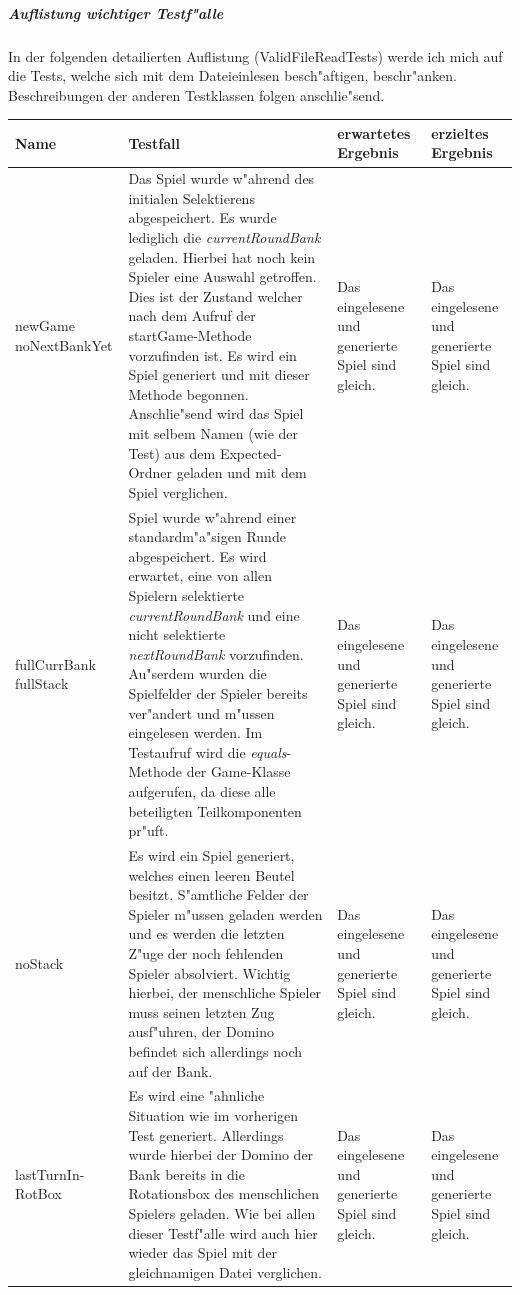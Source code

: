\subparagraph{Auflistung wichtiger Testf"alle}
In der folgenden detailierten Auflistung (ValidFileReadTests) werde ich mich auf die Tests, welche sich mit dem Dateieinlesen besch"aftigen, beschr"anken. Beschreibungen der anderen Testklassen folgen anschlie"send. 

\bigbreak

\begin{tabular}{|p{2cm}|p{7cm}|p{2cm}|p{2cm}|}
	\hline
	Name & Testfall & erwartetes Ergebnis & erzieltes Ergebnis \\
	\hline
	\hline
	newGame noNextBankYet & Das Spiel wurde w"ahrend des initialen Selektierens abgespeichert. Es wurde lediglich die \emph{currentRoundBank} geladen. Hierbei hat noch kein Spieler eine Auswahl getroffen. Dies ist der Zustand welcher nach dem Aufruf der startGame-Methode vorzufinden ist. Es wird ein Spiel generiert und mit dieser Methode begonnen. Anschlie"send wird das Spiel mit selbem Namen (wie der Test) aus dem Expected-Ordner geladen und mit dem Spiel verglichen. & Das eingelesene und generierte Spiel sind gleich. & Das eingelesene und generierte Spiel sind gleich. \\
		
	fullCurrBank fullStack & Spiel wurde w"ahrend einer standardm"a"sigen Runde abgespeichert. Es wird erwartet, eine von allen Spielern selektierte \emph{currentRoundBank} und eine nicht selektierte \emph{nextRoundBank} vorzufinden. Au"serdem wurden die Spielfelder der Spieler bereits ver"andert und m"ussen eingelesen werden. Im Testaufruf wird die \emph{equals}-Methode der Game-Klasse aufgerufen, da diese alle beteiligten Teilkomponenten pr"uft. & Das eingelesene und generierte Spiel sind gleich. & Das eingelesene und generierte Spiel sind gleich. \\
	
	noStack & Es wird ein Spiel generiert, welches einen leeren Beutel besitzt. S"amtliche Felder der Spieler m"ussen geladen werden und es werden die letzten Z"uge der noch fehlenden Spieler absolviert. Wichtig hierbei, der menschliche Spieler muss seinen letzten Zug ausf"uhren, der Domino befindet sich allerdings noch auf der Bank. & Das eingelesene und generierte Spiel sind gleich. & Das eingelesene und generierte Spiel sind gleich. \\
	
	lastTurnIn- \newline RotBox & Es wird eine "ahnliche Situation wie im vorherigen Test generiert. Allerdings wurde hierbei der Domino der Bank bereits in die Rotationsbox des menschlichen Spielers geladen. Wie bei allen dieser Testf"alle wird auch hier wieder das Spiel mit der gleichnamigen Datei verglichen. & Das eingelesene und generierte Spiel sind gleich. & Das eingelesene und generierte Spiel sind gleich. \\	
	\hline
\end{tabular}

